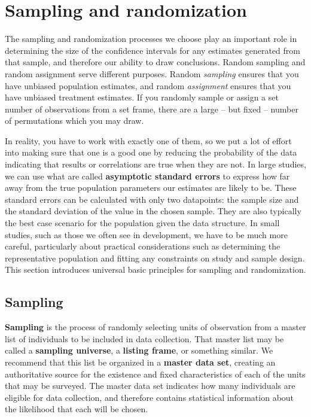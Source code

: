 
\section{Sampling and randomization}

The sampling and randomization processes we choose
play an important role in determining the size of the confidence intervals
for any estimates generated from that sample,
and therefore our ability to draw conclusions.
Random sampling and random assignment serve different purposes.
Random \textit{sampling} ensures that you have unbiased population estimates,
and random \textit{assignment} ensures that you have unbiased treatment estimates.
If you randomly sample or assign a set number of observations from a set frame,
there are a large -- but fixed -- number of permutations which you may draw.

In reality, you have to work with exactly one of them,
so we put a lot of effort into making sure that one is a good one
by reducing the probability of the data indicating that results or correlations are true when they are not.
In large studies, we can use what are called \textbf{asymptotic standard errors}
to express how far away from the true population parameters our estimates are likely to be.
These standard errors can be calculated with only two datapoints:
the sample size and the standard deviation of the value in the chosen sample.
They are also typically the best case scenario for the population given the data structure.
In small studies, such as those we often see in development,
we have to be much more careful, particularly about practical considerations
such as determining the representative population
and fitting any constraints on study and sample design.
This section introduces universal basic principles for sampling and randomization.

\subsection{Sampling}

\textbf{Sampling} is the process of randomly selecting units of observation
from a master list of individuals to be included in data collection.
That master list may be called a \textbf{sampling universe}, a \textbf{listing frame}, or something similar.
We recommend that this list be organized in a \textbf{master data set},
creating an authoritative source for the existence and fixed
characteristics of each of the units that may be surveyed.
The master data set indicates how many individuals are eligible for data collection,
and therefore contains statistical information about the likelihood that each will be chosen.

